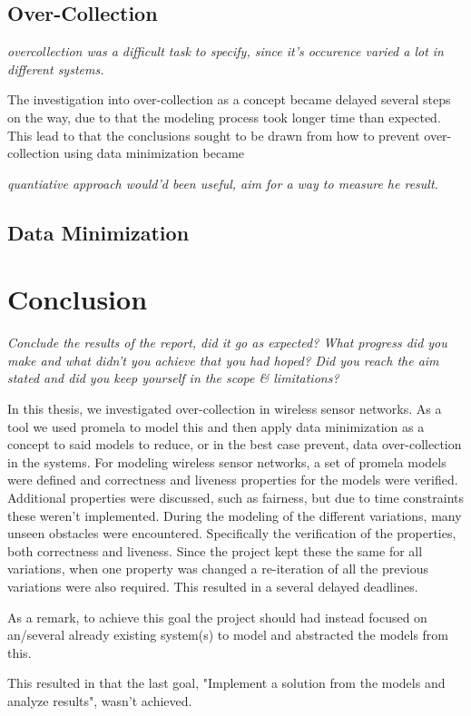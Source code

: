 \section{Over-Collection}

\textit{overcollection was a difficult task to specify, since it's occurence varied a lot in different systems.}

The investigation into over-collection as a concept became delayed several steps on the way, due to that the modeling process took longer time than expected. This lead to that the conclusions sought to be drawn from how to prevent over-collection using data minimization became 

\textit{quantiative approach would'd been useful, aim for a way to measure he result.}


\section{Data Minimization}



\chapter{Conclusion}


\textit{Conclude the results of the report, did it go as expected? What progress did you make and what didn't you achieve that you had hoped? Did you reach the aim stated and did you keep yourself in the scope \& limitations? }

In this thesis, we investigated over-collection in wireless sensor networks. As a tool we used promela to model this and then apply data minimization as a concept to said models to reduce, or in the best case prevent, data over-collection in the systems. For modeling wireless sensor networks, a set of promela models were defined and correctness and liveness properties for the models were verified. Additional properties were discussed, such as fairness, but due to time constraints these weren't implemented. During the modeling of the different variations, many unseen obstacles were encountered. Specifically the verification of the properties, both correctness and liveness. Since the project kept these the same for all variations, when one property was changed a re-iteration of all the previous variations were also required. This resulted in a several delayed deadlines. 

As a remark, to achieve this goal the project should had instead focused on an/several already existing system(s) to model and abstracted the models from this.  

This resulted in that the last goal, "Implement a solution from the models and analyze results", wasn't achieved. 



